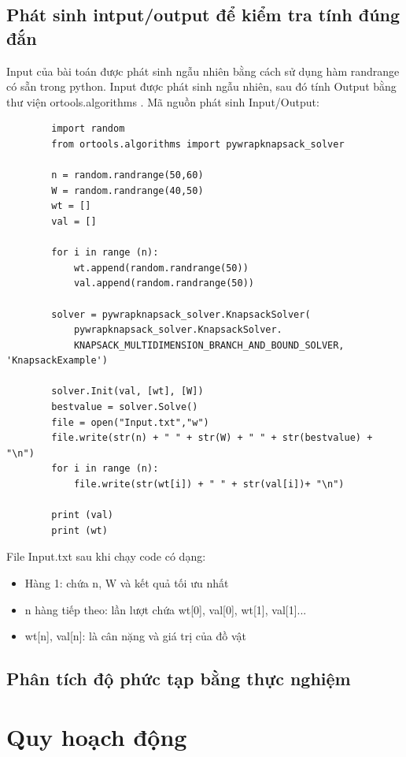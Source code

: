 \documentclass[12pt,a4paper]{report}
\begin{document}
    \subsection{Phát sinh intput/output để kiểm tra tính đúng đắn}
    Input của bài toán được phát sinh ngẫu nhiên bằng cách sử dụng hàm randrange có
    sẵn trong python. Input được phát sinh ngẫu nhiên, sau đó tính Output bằng 
    thư viện ortools.algorithms . Mã nguồn phát sinh Input/Output:
    \begin{lstlisting}
        import random
        from ortools.algorithms import pywrapknapsack_solver
        
        n = random.randrange(50,60)
        W = random.randrange(40,50)
        wt = []
        val = []
        
        for i in range (n):
            wt.append(random.randrange(50))
            val.append(random.randrange(50))
        
        solver = pywrapknapsack_solver.KnapsackSolver(
            pywrapknapsack_solver.KnapsackSolver.
            KNAPSACK_MULTIDIMENSION_BRANCH_AND_BOUND_SOLVER, 'KnapsackExample')
        
        solver.Init(val, [wt], [W])
        bestvalue = solver.Solve()
        file = open("Input.txt","w")
        file.write(str(n) + " " + str(W) + " " + str(bestvalue) + "\n")
        for i in range (n):
            file.write(str(wt[i]) + " " + str(val[i])+ "\n")
        
        print (val)
        print (wt)
    \end{lstlisting}
    File Input.txt sau khi chạy code có dạng:
    \begin{itemize}
        \item Hàng 1: chứa n, W và kết quả tối ưu nhất
        \item n hàng tiếp theo: lần lượt chứa wt[0], val[0], wt[1], val[1]... 
        \item wt[n], val[n]: là cân nặng và giá trị của đồ vật
    \end{itemize}
    \subsection{Phân tích độ phức tạp bằng thực nghiệm}
    \section{Quy hoạch động}
\end{document}
